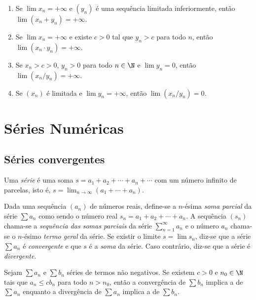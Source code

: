 \documentclass{article}
\begin{document}
\begin{thm}
    \begin{enumerate}
        \item [(i)] Se \(\lim x_n = +\infty\) e \((y_n)\) é uma sequência limitada inferiormente, então \(\lim (x_n + y_n) = +\infty\).
        \item [(ii)] Se \(\lim x_n = +\infty\) e existe \(c > 0\) tal que \(y_n > c\) para todo \(n\), então \(\lim (x_n \cdot y_n) = +\infty\).
        \item [(iii)] Se \(x_n > c > 0\), \(y_n > 0\) para todo \(n \in \N\) e \(\lim y_n = 0\), então \(\lim (x_n / y_n) = +\infty\).
        \item [(iv)] Se \((x_n)\) é limitada e \(\lim y_n = +\infty\), então \(\lim (x_n / y_n) = 0\).
    \end{enumerate}
\end{thm}

\section{Séries Numéricas}

\subsection{Séries convergentes}

\begin{defn}
    Uma \emph{série} é uma soma \(s = a_1 + a_2 + \cdots + a_n + \cdots\) com um número infinito de parcelas, isto é, \(s = \lim_{n \to \infty} (a_1 + \cdots + a_n)\).
\end{defn}

\begin{defn}
    Dada uma sequência \((a_n)\) de números reais, define-se a \(n\)-ésima \emph{soma parcial} da série \(\sum a_n\) como sendo o número real \(s_n = a_1 + a_2 + \cdots + a_n\). A sequência \((s_n)\) chama-se a \emph{sequência das somas parciais} da série \(\sum_{n=1}^{\infty} a_n\) e o número \(a_n\) chama-se o \(n\)-ésimo \emph{termo geral} da série.
    Se existir o limite \(s = \lim s_n\), diz-se que a série \(\sum a_n\) é \emph{convergente} e que \(s\) é a \emph{soma} da série. Caso contrário, diz-se que a série é \emph{divergente}.
\end{defn}

\begin{thm} 
    Sejam \(\sum a_n\) e \(\sum b_n\) séries de termos não negativos. Se existem \(c>0\) e \(n_0 \in \N\) tais que \(a_n \leq c b_n\) para todo \(n>n_0\), então a convergência de \(\sum b_n\) implica a de \(\sum a_n\) enquanto a divergência de \(\sum a_n\) implica a de \(\sum b_n\).
\end{thm}
\end{document}
